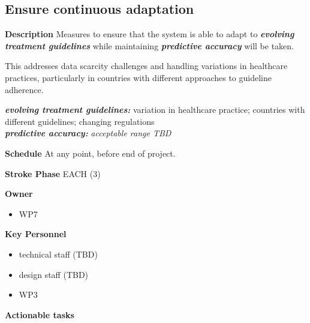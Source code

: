 \documentclass[
  letterpaper,
  DIV=11,
  numbers=noendperiod]{scrreport}
\providecommand{\tightlist}{%
  \setlength{\itemsep}{0pt}\setlength{\parskip}{0pt}}\usepackage{longtable,booktabs,array}
\begin{document}
\hypertarget{ensure-continuous-adaptation}{%
\subsection{Ensure continuous
adaptation}\label{ensure-continuous-adaptation}}

\textbf{Description} Measures to ensure that the system is able to adapt
to \textbf{\emph{evolving treatment guidelines}} while maintaining
\textbf{\emph{predictive accuracy}} will be taken.

\begin{tcolorbox}[enhanced jigsaw, arc=.35mm, breakable, coltitle=black, toptitle=1mm, colbacktitle=quarto-callout-note-color!10!white, toprule=.15mm, left=2mm, bottomrule=.15mm, opacitybacktitle=0.6, titlerule=0mm, colback=white, opacityback=0, title=\textcolor{quarto-callout-note-color}{\faInfo}\hspace{0.5em}{Note}, bottomtitle=1mm, colframe=quarto-callout-note-color-frame, leftrule=.75mm, rightrule=.15mm]

This addresses data scarcity challenges and handling variations in
healthcare practices, particularly in countries with different
approaches to guideline adherence.

\end{tcolorbox}

\textbf{\emph{evolving treatment guidelines:}} variation in healthcare
practice; countries with different guidelines; changing regulations\\
\textbf{\emph{predictive accuracy:}} \emph{acceptable range TBD}

\textbf{Schedule} At any point, before end of project.

\textbf{Stroke Phase} EACH (3)

\textbf{Owner}

\begin{itemize}
\tightlist
\item
  WP7
\end{itemize}

\textbf{Key Personnel}

\begin{itemize}
\tightlist
\item
  technical staff (TBD)
\item
  design staff (TBD)
\item
  WP3
\end{itemize}

\textbf{Actionable tasks}
\end{document}
